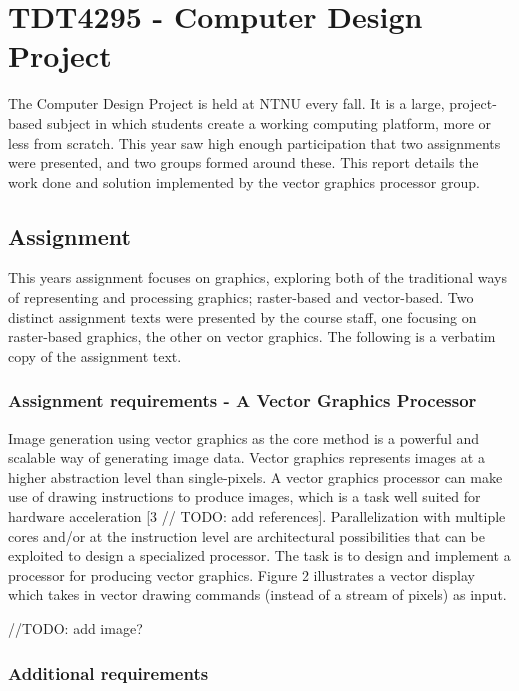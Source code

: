 \chapter{TDT4295 - Computer Design Project}

The Computer Design Project is held at NTNU every fall.
It is a large, project-based subject in which students create a working computing platform, more or less from scratch.
This year saw high enough participation that two assignments were presented, and two groups formed around these.
This report details the work done and solution implemented by the vector graphics processor group.

\section{Assignment}

This years assignment focuses on graphics, exploring both of the traditional ways of representing and processing graphics; raster-based and vector-based.
Two distinct assignment texts were presented by the course staff, one focusing on raster-based graphics, the other on vector graphics.
The following is a verbatim copy of the assignment text.

\subsection{Assignment requirements - A Vector Graphics Processor}

Image generation using vector graphics as the core method is a powerful and scalable way of generating image data.
Vector graphics represents images at a higher abstraction level than single-pixels.
A vector graphics processor can make use of drawing instructions to produce images, which is a task well suited for hardware acceleration [3 // TODO: add references].
Parallelization with multiple cores and/or at the instruction level are architectural possibilities that can be exploited to design a specialized processor.
The task is to design and implement a processor for producing vector graphics.
Figure 2 illustrates a vector display which takes in vector drawing commands (instead of a stream of pixels) as input.

//TODO: add image?

\subsection{Additional requirements}

